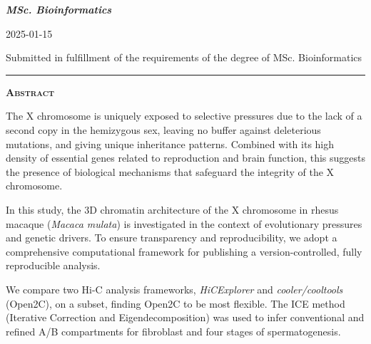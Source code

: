 \documentclass[
  11pt,
  a4paper,
]{scrbook}
\begin{document}
{{\bfseries\Large\textit{MSc. Bioinformatics} \par}
\vspace{3ex}

{\large 2025-01-15 \par}
\vspace{3ex}

\vspace{10ex}
{\small Submitted in fulfillment of the requirements
of the degree of MSc. Bioinformatics \par}
\pagebreak


\vspace*{\fill} %
\noindent
\begin{minipage}{.8\textwidth}
    \centering
    \hspace*{\fill}\rule{0.5\textwidth}{0.4pt}\hspace*{\fill} %
    \par \vspace{2em} %
    {\Large\bfseries\scshape Abstract} %
    \par %
    \vspace{1em} %
    \justifying %
    The X chromosome is uniquely exposed to selective pressures due to
the lack of a second copy in the hemizygous sex, leaving no buffer
against deleterious mutations, and giving unique inheritance patterns.
Combined with its high density of essential genes related to
reproduction and brain function, this suggests the presence of
biological mechanisms that safeguard the integrity of the X chromosome.

In this study, the 3D chromatin architecture of the X chromosome in
rhesus macaque (\emph{Macaca mulata}) is investigated in the context of
evolutionary pressures and genetic drivers. To ensure transparency and
reproducibility, we adopt a comprehensive computational framework for
publishing a version-controlled, fully reproducible analysis.

We compare two Hi-C analysis frameworks, \emph{HiCExplorer} and
\emph{cooler/cooltools} (Open2C), on a subset, finding Open2C to be most
flexible. The ICE method (Iterative Correction and Eigendecomposition)
was used to infer conventional and refined A/B compartments for
fibroblast and four stages of spermatogenesis.


\end{minipage}}
\end{document}
